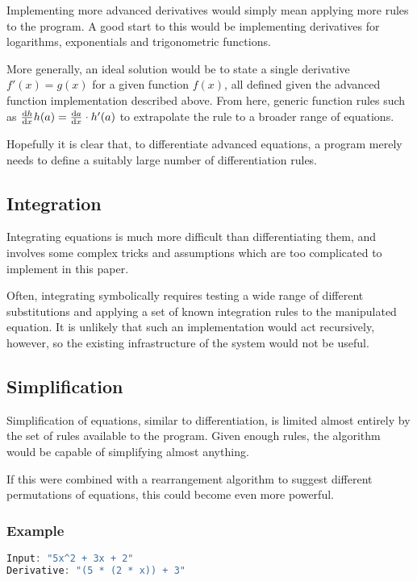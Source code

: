 \documentclass[12pt]{article}
\begin{document}
Implementing more advanced derivatives would simply mean applying more rules to the program. A good start to this would be implementing derivatives for logarithms, exponentials and trigonometric functions.

More generally, an ideal solution would be to state a single derivative $f'(x)=g(x)$ for a given function $f(x)$, all defined given the advanced function implementation described above. From here, generic function rules such as $\dv{h}{x} h(a) = \dv{a}{x} \cdot h'(a)$ to extrapolate the rule to a broader range of equations.

Hopefully it is clear that, to differentiate advanced equations, a program merely needs to define a suitably large number of differentiation rules.

\subsection{Integration}

Integrating equations is much more difficult than differentiating them, and involves some complex tricks and assumptions \cite{mathematicainternals} which are too complicated to implement in this paper.

Often, integrating symbolically requires testing a wide range of different substitutions and applying a set of known integration rules to the manipulated equation. It is unlikely that such an implementation would act recursively, however, so the existing infrastructure of the system would not be useful.

\subsection{Simplification}

Simplification of equations, similar to differentiation, is limited almost entirely by the set of rules available to the program. Given enough rules, the algorithm would be capable of simplifying almost anything.

If this were combined with a rearrangement algorithm to suggest different permutations of equations, this could become even more powerful.

\subsubsection{Example}

\begin{lstlisting}[language=C++]
Input: "5x^2 + 3x + 2"
Derivative: "(5 * (2 * x)) + 3"
\end{lstlisting}
\end{document}
